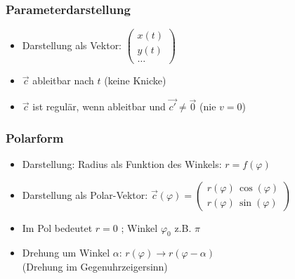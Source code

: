 \medskip

\begin{minipage}[t]{0.48\columnwidth}
    \subsubsection*{Parameterdarstellung}

    \begin{itemize}
        \item Darstellung als Vektor: $\begin{pmatrix} x(t) \\ y(t) \\ \dots \end{pmatrix}$
        \item $\vec{c}$ ableitbar nach $t$ (keine Knicke)
        \item $\vec{c}$ ist regulär, wenn ableitbar und $\vec{c'} \neq \vec{0}$ (nie $v=0$)
    \end{itemize}
\end{minipage}
\hfill
\begin{minipage}[t]{0.48\columnwidth}
    \subsubsection*{Polarform}

    \begin{itemize}
        \item Darstellung: Radius als Funktion des Winkels:  $r = f(\varphi)$
        \item Darstellung als Polar-Vektor: $\vec{c}(\varphi) = \begin{pmatrix} r(\varphi) \, \cos(\varphi) \\ r(\varphi) \, \sin(\varphi) \end{pmatrix}$
        \item Im Pol bedeutet $r = 0$ ; Winkel $\varphi_0$ z.B. $\pi$
        \item Drehung um Winkel $\alpha$: $r(\varphi) \rightarrow r(\varphi - \alpha)$ \\
            (Drehung  im Gegenuhrzeigersinn)
    \end{itemize}
\end{minipage}

\medskip


